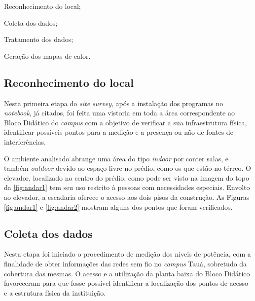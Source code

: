 \begin{compactenum}
	\item Reconhecimento do local;
	\item Coleta dos dados;
	\item Tratamento dos dados;
	\item Geração dos mapas de calor.
\end{compactenum}

\subsection{Reconhecimento do local}
\label{subsec:reconhecimento-do-local}

Nesta primeira etapa do \textit{site survey}, após a instalação dos programas no \textit{notebook}, já citados, foi feita uma vistoria em toda a área correspondente ao Bloco Didático do \textit{campus} com a objetivo de verificar a sua infraestrutura física, identificar possíveis pontos para a medição e a presença ou não de fontes de interferências.

O ambiente analisado abrange uma área do tipo \textit{indoor} por conter salas, e também \textit{outdoor} devido ao espaço livre no prédio, como os que estão no térreo. O elevador, localizado no centro do prédio, como pode ser visto na imagem do topo da \autoref{fig:andar1} tem seu uso restrito à pessoas com necessidades especiais. Envolto ao elevador, a escadaria oferece o acesso aos dois pisos da construção. As Figuras \ref{fig:andar1} e \ref{fig:andar2} mostram alguns dos pontos que foram verificados.

\begin{figure}[H]
	\centering
\end{figure}

\begin{figure}[H]
	\centering
\end{figure}

\subsection{Coleta dos dados}
\label{subsec:coleta-de-dados}

Nesta etapa foi iniciado o procedimento de medição dos níveis de potência, com a finalidade de obter informações das redes sem fio no \textit{campus} Tauá, sobretudo da cobertura das mesmas. O acesso e a utilização da planta baixa do Bloco Didático favoreceram para que fosse possível identificar a localização dos pontos de acesso e a estrutura física da instituição.

